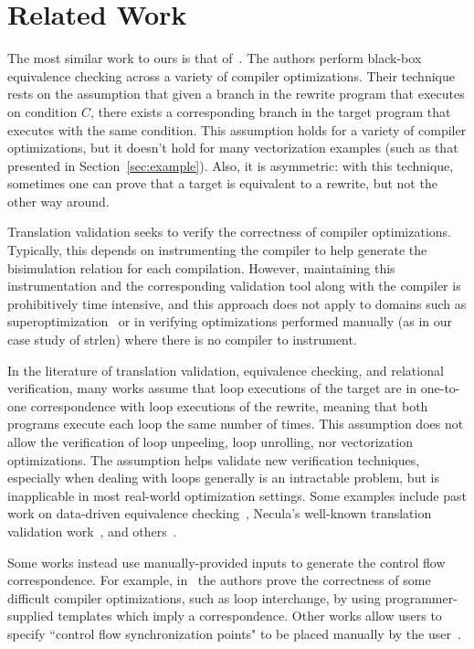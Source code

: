 \section{Related Work}\label{sec:related}

The most similar work to ours is that of~\cite{Dahiya17ASPLAS}. The
authors perform black-box equivalence checking across a variety of
compiler optimizations. Their technique rests on the assumption that
given a branch in the rewrite program that executes on condition $C$,
there exists a corresponding branch in the target program that executes
with the same condition. This assumption holds for a variety of
compiler optimizations, but it doesn't hold for many vectorization
examples (such as that presented in Section~\ref{sec:example}). Also,
it is asymmetric: with this technique, sometimes one can prove that a
target is equivalent to a rewrite, but not the other way around.

Translation validation seeks to verify
the correctness of compiler optimizations. Typically, this
depends on instrumenting the compiler to help generate
the bisimulation relation for each compilation. However,
maintaining this instrumentation and the corresponding
validation tool along with the compiler is prohibitively time
intensive, and this approach does not apply to domains such as
superoptimization~\cite{Massalin1987,Schkufza2013,Churchill2017} or in
verifying optimizations performed manually (as in our case study of
\libc{} strlen) where there is no compiler to instrument.

In the literature of translation validation, equivalence checking,
and relational verification, many works assume that loop executions
of the target are in one-to-one correspondence with loop executions
of the rewrite, meaning that both programs execute each loop the same
number of times. This assumption does not allow the verification of
loop unpeeling, loop unrolling, nor vectorization optimizations.
The assumption helps validate new verification techniques,
especially when dealing with loops generally is an intractable
problem, but is inapplicable in most real-world optimization
settings. Some examples include past work on data-driven equivalence
checking~\cite{Sharma2013}, Necula's well-known translation validation
work~\cite{Necula2000}, and others~\cite{Fedykovich2015}. 

Some works instead use manually-provided inputs to generate the
control flow correspondence. For example, in~\cite{Kundu2009}
the authors prove the correctness of some difficult compiler
optimizations, such as loop interchange, by using programmer-supplied
templates which imply a correspondence. Other works allow users to
specify ``control flow synchronization points" to be placed manually
by the user~\cite{Kiefer2016}.

